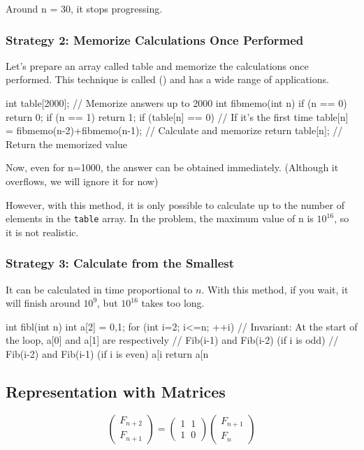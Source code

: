 Around n = 30, it stops progressing.

\subsubsection*{Strategy 2: Memorize Calculations Once Performed}\label{section:memoization}

Let's prepare an array called table and memorize the calculations once performed. This technique is called  () and has a wide range of applications.

\begin{cbox}
int table[2000]; // Memorize answers up to 2000
int fibmemo(int n) {
    if (n == 0) return 0;
    if (n == 1) return 1;
    if (table[n] == 0) // If it's the first time
      table[n] = fibmemo(n-2)+fibmemo(n-1); // Calculate and memorize
    return table[n]; // Return the memorized value
}
\end{cbox}

Now, even for n=1000, the answer can be obtained immediately. (Although it overflows, we will ignore it for now)

However, with this method, it is only possible to calculate up to the number of elements in the \texttt{table} array. In the problem, the maximum value of n is $10^{16}$, so it is not realistic.

\subsubsection*{Strategy 3: Calculate from the Smallest}
It can be calculated in time proportional to $n$. With this method, if you wait, it will finish around $10^{9}$, but $10^{16}$ takes too long.

\begin{cbox}
int fibl(int n) {
    int a[2] = {0,1};
    for (int i=2; i<=n; ++i) {
        // Invariant: At the start of the loop, a[0] and a[1] are respectively
        //   Fib(i-1) and Fib(i-2) (if i is odd)
        //   Fib(i-2) and Fib(i-1) (if i is even)
        a[i%
    }
    return a[n%
}
\end{cbox}
\subsection{Representation with Matrices}

$$\left(
\begin{array}{cc}
  F_{n+2} \\ F_{n+1}
\end{array}\right)
 = 
\left(\begin{array}{cc}
  1 \phantom{x} 1 \\ 1 \phantom{x} 0
\end{array}\right)
\left(\begin{array}{cc}
  F_{n+1} \\ F_n
\end{array}\right)
$$


